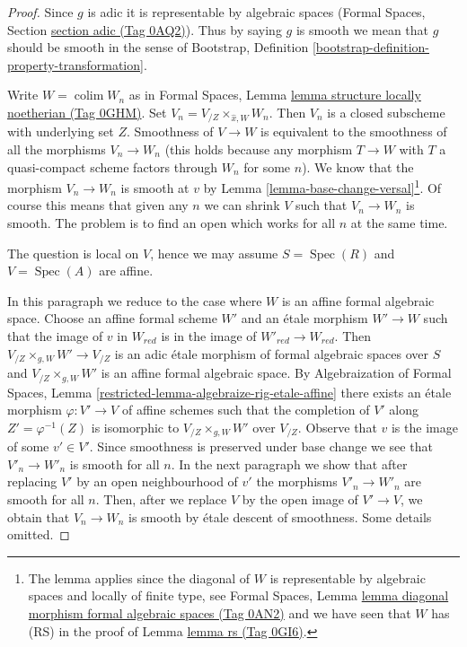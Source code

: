 \documentclass{amsart}
\theoremstyle{plain}
\theoremstyle{definition}
\theoremstyle{remark}
\numberwithin{equation}{subsection}
\def\colim{\mathop{\mathrm{colim}}\nolimits}
\def\Spec{\mathop{\mathrm{Spec}}}
\begin{document}
\begin{proof}
Since $g$ is adic it is representable by algebraic spaces (Formal Spaces,
Section \href{https://stacks.math.columbia.edu/tag/0AQ2}{section adic (Tag 0AQ2)}).
Thus by saying $g$ is smooth we mean that $g$ should be smooth
in the sense of
Bootstrap, Definition \ref{bootstrap-definition-property-transformation}.

\medskip\noindent
Write $W = \colim W_n$ as in Formal Spaces, Lemma
\href{https://stacks.math.columbia.edu/tag/0GHM}{lemma structure locally noetherian (Tag 0GHM)}.
Set $V_n = V_{/Z} \times_{\hat x, W} W_n$.
Then $V_n$ is a closed subscheme with underlying set $Z$.
Smoothness of $V \to W$ is equivalent to the smoothness
of all the morphisms $V_n \to W_n$ (this holds because any morphism
$T \to W$ with $T$ a quasi-compact scheme factors through
$W_n$ for some $n$). We know that the morphism $V_n \to W_n$
is smooth at $v$ by
Lemma \ref{lemma-base-change-versal}\footnote{The lemma applies since
the diagonal of $W$ is representable by algebraic spaces and
locally of finite type, see Formal Spaces, Lemma
\href{https://stacks.math.columbia.edu/tag/0AN2}{lemma diagonal morphism formal algebraic spaces (Tag 0AN2)}
and we have seen that $W$ has (RS) in the proof of Lemma \href{https://stacks.math.columbia.edu/tag/0GI6}{lemma rs (Tag 0GI6)}.}.
Of course this means that given any $n$ we can shrink $V$
such that $V_n \to W_n$ is smooth. The problem is to find
an open which works for all $n$ at the same time.

\medskip\noindent
The question is local on $V$, hence we may assume $S = \Spec(R)$ and
$V = \Spec(A)$ are affine.

\medskip\noindent
In this paragraph we reduce to the case where $W$ is an affine formal
algebraic space. Choose an affine formal scheme $W'$ and an \'etale morphism
$W' \to W$ such that the image of $v$ in $W_{red}$ is in the
image of $W'_{red} \to W_{red}$. Then $V_{/Z} \times_{g, W} W' \to V_{/Z}$
is an adic \'etale morphism of formal algebraic spaces over $S$
and $V_{/Z} \times_{g, W} W'$ is an affine formal algebraic space.
By Algebraization of Formal Spaces,
Lemma \ref{restricted-lemma-algebraize-rig-etale-affine}
there exists an \'etale morphism $\varphi : V' \to V$ of affine schemes
such that the completion of $V'$ along $Z' = \varphi^{-1}(Z)$
is isomorphic to $V_{/Z} \times_{g, W} W'$ over $V_{/Z}$.
Observe that $v$ is the image of some $v' \in V'$.
Since smoothness is preserved under base change we see that
$V'_n \to W'_n$ is smooth for all $n$. In the next paragraph
we show that after replacing $V'$ by an open neighbourhood of $v'$
the morphisms $V'_n \to W'_n$ are smooth for all $n$.
Then, after we replace $V$ by the open image of $V' \to V$,
we obtain that $V_n \to W_n$ is smooth by \'etale descent of smoothness.
Some details omitted.


\end{proof}
\end{document}
